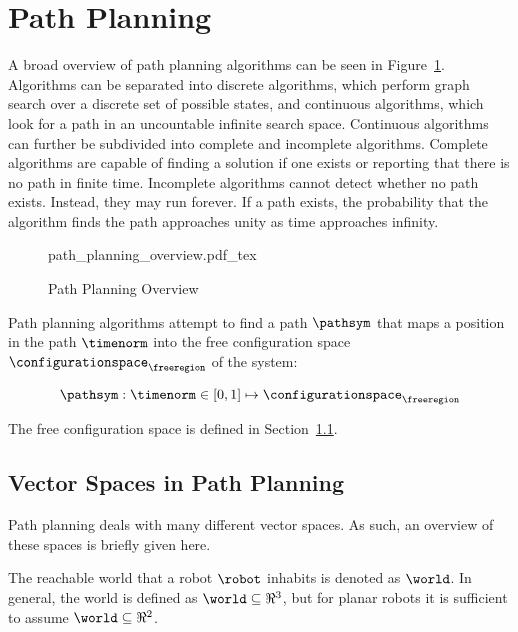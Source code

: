 \section{Path Planning}%
\label{sec:path_planning}

	A broad overview of path planning algorithms can be seen in
	Figure~\ref{fig:path_planning_overview}. Algorithms can be separated into
	discrete algorithms, which perform graph search over a discrete set of
	possible states, and continuous algorithms, which look for a path in an
	uncountable infinite search space. Continuous algorithms can further be
	subdivided into complete and incomplete algorithms. Complete algorithms are
	capable of finding a solution if one exists or reporting that there is no
	path in finite time. Incomplete algorithms cannot detect whether no path
	exists. Instead, they may run forever. If a path exists, the probability
	that the algorithm finds the path approaches unity as time approaches
	infinity.

	\begin{figure}[hb]
		\centering
		\def\svgwidth{\columnwidth}
		{path_planning_overview.pdf_tex}
		\caption{Path Planning Overview}%
		\label{fig:path_planning_overview}
	\end{figure}

	Path planning algorithms attempt to find a path $\pathsym$ that maps a
	position in the path $\timenorm$ into the free configuration space
	$\configurationspace_{\freeregion}$ of the system:

	\begin{equation}
		\pathsym : \timenorm \in [0, 1] \mapsto \configurationspace_{\freeregion}
	\end{equation}

	The free configuration space is defined in
	Section~\ref{sec:vector_spaces_in_path_planning}.


	\subsection{Vector Spaces in Path Planning}%
	\label{sec:vector_spaces_in_path_planning}

		Path planning deals with many different vector spaces. As such, an
		overview of these spaces is briefly given here.

		The reachable world that a robot $\robot$ inhabits is denoted as
		$\world$. In general, the world is defined as $\world \subseteq \Re^3$,
		but for planar robots it is sufficient to assume $\world \subseteq
		\Re^2$.

